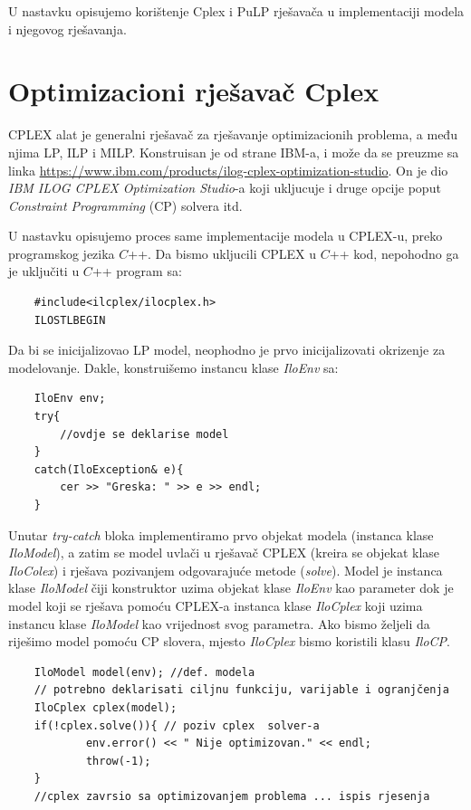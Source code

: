 \documentclass[a4paper, utf8, 11pt, colorlinks]{book}
\begin{document}
 U nastavku opisujemo korištenje Cplex i PuLP rješavača u implementaciji modela i njegovog rješavanja. 
 
 \section{Optimizacioni rješavač Cplex}
 CPLEX alat je generalni rješavač za rješavanje optimizacionih problema, a među njima  LP, ILP i MILP. Konstruisan je od strane IBM-a, i može da se preuzme sa linka \url{https://www.ibm.com/products/ilog-cplex-optimization-studio}. On je dio \emph{IBM ILOG CPLEX Optimization Studio}-a koji ukljucuje i druge opcije poput \emph{Constraint Programming} (CP) solvera itd.
 
 U nastavku opisujemo proces same implementacije modela u CPLEX-u, preko programskog jezika $C$++.
 Da bismo ukljucili CPLEX u $C$++ kod, nepohodno ga je uključiti u $C$++ program sa:
 \begin{verbatim}
 	#include<ilcplex/ilocplex.h>
 	ILOSTLBEGIN
 \end{verbatim}
 Da bi se inicijalizovao LP model, neophodno je prvo inicijalizovati okrizenje za modelovanje. Dakle, konstruišemo instancu klase \emph{IloEnv} sa: 
 \begin{verbatim}
 	IloEnv env;
 	try{
 		//ovdje se deklarise model
 	}
 	catch(IloException& e){
 		cer >> "Greska: " >> e >> endl;
 	}
 \end{verbatim}
 
 \noindent Unutar \emph{try-catch} bloka implementiramo prvo objekat modela (instanca klase \emph{IloModel}), a zatim se model uvlači u rješavač CPLEX (kreira se objekat klase \emph{IloColex}) i rješava pozivanjem odgovarajuće metode (\emph{solve}).
 Model je instanca klase \emph{IloModel} čiji konstruktor uzima objekat klase \emph{IloEnv} kao parameter dok je model koji se rješava pomoću CPLEX-a instanca klase \emph{IloCplex} koji uzima instancu klase \emph{IloModel} kao vrijednost svog parametra.  Ako bismo željeli da riješimo model pomoću CP slovera, mjesto \emph{IloCplex} bismo koristili klasu \emph{IloCP}. 
 

 \begin{verbatim}
 	IloModel model(env); //def. modela
 	// potrebno deklarisati ciljnu funkciju, varijable i ogranjčenja
 	IloCplex cplex(model);
 	if(!cplex.solve()){ // poziv cplex  solver-a
 		    env.error() << " Nije optimizovan." << endl;
 		    throw(-1);
 	}
 	//cplex zavrsio sa optimizovanjem problema ... ispis rjesenja
 \end{verbatim}
 
\end{document}
